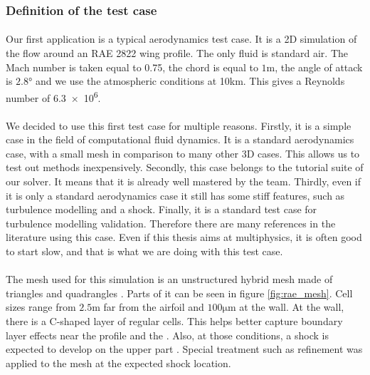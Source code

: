       \subsubsection{Definition of the test case}



        \paragraph{}
        Our first application is a typical aerodynamics test case.
        It is a 2D simulation of the flow around an RAE 2822 wing profile.
        The only fluid is standard air.
        The Mach number is taken equal to 0.75, the chord is equal to $1\si{\meter}$, the angle of attack is $2.8\si{\degree}$ and we use the atmospheric conditions at 10km.
        This gives a Reynolds number of \num{6.3e6}.

        \paragraph{}
        We decided to use this first test case for multiple reasons.
        Firstly, it is a simple case in the field of computational fluid dynamics.
        It is a standard aerodynamics case, with a small mesh in comparison to many other 3D cases.
        This allows us to test out methods inexpensively.
        Secondly, this case belongs to the tutorial suite of our solver.
        It means that it is already well mastered by the team.
        Thirdly, even if it is only a standard aerodynamics case it still has some stiff features, such as turbulence modelling and a shock.
        Finally, it is a standard test case for turbulence modelling validation.
        Therefore there are many references in the literature using this case. 
        Even if this thesis aims at multiphysics, it is often good to start slow, and that is what we are doing with this test case.

        \paragraph{}
        The mesh used for this simulation is an unstructured hybrid mesh made of triangles and quadrangles .
        Parts of it can be seen in figure \ref{fig:rae_mesh}.
        Cell sizes range from $2.5\si{\meter}$ far from the airfoil and $100\si{\micro\meter}$ at the wall.
        At the wall, there is a C-shaped layer of regular cells.
        This helps better capture boundary layer effects near the profile and the .
        Also, at those conditions, a shock is expected to develop on the upper part .
        Special treatment such as refinement was applied to the mesh at the expected shock location.

